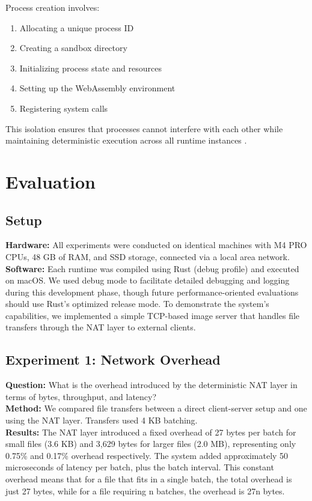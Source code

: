 \documentclass[10pt, 
]{IEEEtran}
\begin{document}
Process creation involves:
\begin{enumerate}
    \item Allocating a unique process ID
    \item Creating a sandbox directory
    \item Initializing process state and resources
    \item Setting up the WebAssembly environment
    \item Registering system calls
\end{enumerate}

This isolation ensures that processes cannot interfere with each other while maintaining deterministic execution across all runtime instances \cite{replicode2025}.

\section{Evaluation}

\subsection{Setup}
\textbf{Hardware:} All experiments were conducted on identical machines with M4 PRO CPUs, 48 GB of RAM, and SSD storage, connected via a local area network. \\
\textbf{Software:} Each runtime was compiled using Rust (debug profile) and executed on macOS. We used debug mode to facilitate detailed debugging and logging during this development phase, though future performance-oriented evaluations should use Rust's optimized release mode. To demonstrate the system's capabilities, we implemented a simple TCP-based image server that handles file transfers through the NAT layer to external clients.

\subsection{Experiment 1: Network Overhead}
\textbf{Question:} What is the overhead introduced by the deterministic NAT layer in terms of bytes, throughput, and latency? \\
\textbf{Method:} We compared file transfers between a direct client-server setup and one using the NAT layer. Transfers used 4 KB batching. \\
\textbf{Results:} The NAT layer introduced a fixed overhead of 27 bytes per batch for small files (3.6 KB) and 3,629 bytes for larger files (2.0 MB), representing only 0.75\% and 0.17\% overhead respectively. The system added approximately 50 microseconds of latency per batch, plus the batch interval. This constant overhead means that for a file that fits in a single batch, the total overhead is just 27 bytes, while for a file requiring n batches, the overhead is 27n bytes.
\end{document}

